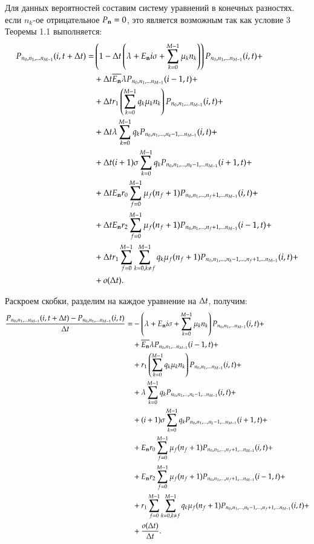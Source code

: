Для данных вероятностей составим систему уравнений в конечных разностях. 
если \(n_k\)-ое отрицательное \(P_{\bold{n}} = 0\),
это является возможным так как условие 3 Теоремы 1.1 выполняется: 
\begin{equation*}\begin{aligned}   
{P}_{{n}_0, {n}_1, ... {n}_{M-1}}(i,t+\Delta t)= 
    &\left( {1-\Delta t\left( {\lambda + E_{\bold{n}} i \sigma+\sum_{{k}=0}^{M-1}\mu_{k}{n}_{k}} \right)} \right)
        {P}_{{n}_0, {n}_1, ... {n}_{M-1}}(i,t)+\\
    &+\Delta t \overline{E_{\bold{n}}} \lambda {P}_{{n}_0, {n}_1, ... {n}_{M-1}}(i-1,t)+\\
    &+\Delta t r_1 \left( {\sum_{{k}=0}^{M-1} q_{k}\mu_{k}{n}_{k}} \right) {P}_{{n}_0, {n}_1, ... {n}_{M-1}}(i,t) + \\
    &+\Delta t \lambda\sum_{k=0}^{M-1}q_k {P}_{{n}_0, {n}_1, ... , {n}_{k} - 1, ... {n}_{M-1}}(i,t) + \\
    &+\Delta t (i+1)\sigma\sum_{k=0}^{M-1}q_k {P}_{{n}_0, {n}_1, ... , {n}_{k} - 1, ... {n}_{M-1}}(i+1,t) + \\
    &+\Delta t E_{\bold{n}} r_0 \sum_{f=0}^{M-1} \mu_f (n_f + 1) {P}_{{n}_0, {n}_1, ... , {n}_{f} + 1, ... {n}_{M-1}}(i,t) + \\
    &+\Delta t E_{\bold{n}} r_2 \sum_{f=0}^{M-1} \mu_f (n_f + 1) {P}_{{n}_0, {n}_1, ... , {n}_{f} + 1, ... {n}_{M-1}}(i-1,t) + \\
    &+\Delta t r_1 \sum_{{f}=0}^{M-1} \sum_{{k}=0, {k} \neq {f}}^{M-1}
        q_k \mu_f (n_f+1) {P}_{{n}_0, {n}_1, ... , {n}_{k} - 1, ... , {n}_{f} + 1, ... {n}_{M-1}}(i,t) + \\
    &+o(\Delta t).
\end{aligned}\end{equation*}

Раскроем скобки, разделим на каждое уравнение на \(\Delta t\), получим:
\begin{equation*}\begin{aligned}
\frac{{P}_{{n}_0, {n}_1, ... {n}_{M-1}}(i,t+\Delta t)-{P}_{{n}_0, {n}_1, ... {n}_{M-1}}(i,t)}{\Delta t}= 
    &-\left( {\lambda + E_{\bold{n}} i \sigma+\sum_{{k}=0}^{M-1}\mu_{k}{n}_{k}} \right){P}_{{n}_0, {n}_1, ... {n}_{M-1}}(i,t)+\\
    &+\overline{E_{\bold{n}}} \lambda {P}_{{n}_0, {n}_1, ... {n}_{M-1}}(i-1,t)+\\
    &+r_1 \left( {\sum_{{k}=0}^{M-1} q_{k}\mu_{k}{n}_{k}} \right) {P}_{{n}_0, {n}_1, ... {n}_{M-1}}(i,t) + \\
    &+\lambda\sum_{k=0}^{M-1}q_k {P}_{{n}_0, {n}_1, ... , {n}_{k} - 1, ... {n}_{M-1}}(i,t) + \\
    &+(i+1)\sigma\sum_{k=0}^{M-1}q_k {P}_{{n}_0, {n}_1, ... , {n}_{k} - 1, ... {n}_{M-1}}(i+1,t) + \\
    &+E_{\bold{n}} r_0 \sum_{f=0}^{M-1} \mu_f (n_f + 1) {P}_{{n}_0, {n}_1, ... , {n}_{f} + 1, ... {n}_{M-1}}(i,t) + \\
    &+E_{\bold{n}} r_2 \sum_{f=0}^{M-1} \mu_f (n_f + 1) {P}_{{n}_0, {n}_1, ... , {n}_{f} + 1, ... {n}_{M-1}}(i-1,t) + \\
    &+r_1 \sum_{{f}=0}^{M-1} \sum_{{k}=0, {k} \neq {f}}^{M-1}
        q_k \mu_f (n_f+1) {P}_{{n}_0, {n}_1, ... , {n}_{k} - 1, ... , {n}_{f} + 1, ... {n}_{M-1}}(i,t) + \\
    &+\frac{o(\Delta t)}{\Delta t}.
\end{aligned}\end{equation*}

